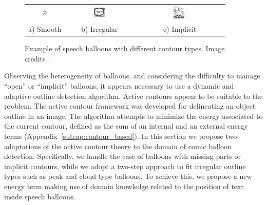 	\begin{figure}[!ht]%
	\begin{center}
	  \begin{tabular}{ccc}
	  \includegraphics[trim= 0px 2px 0mm 0mm, clip, width=0.13\textwidth]{round_balloon.png}&
	  \includegraphics[trim= 0mm 0mm 0mm 0mm, clip, width=0.17\textwidth]{peaked_balloon.png}&
	  \includegraphics[trim= 15px 7mm 5px 0mm, clip, width=0.145\textwidth]{open_balloon.png} \\ 
	  \footnotesize a) Smooth	& \footnotesize b) Irregular & \footnotesize c) Implicit
	  \end{tabular}
	\caption[Speech balloon contour types]{Example of speech balloons with different contour types. Image credits~\cite{Bubble09}.}
	\label{fig:se:balloon_examples}
	\end{center}
	\end{figure}	

Observing the heterogeneity of balloons, and considering the difficulty to manage ``open'' or ``implicit'' balloons, it appears necessary to use a dynamic and adaptive outline detection algorithm.
Active contours appear to be suitable to the problem.
The active contour framework was developed for delineating an object outline in an image.
The algorithm attempts to minimize the energy associated to the current contour, defined as the sum of an internal and an external energy terms (Appendix~\ref{sub:ap:contour_based}). 
In this section we propose two adaptations of the active contour theory to the domain of comic balloon detection.
Specifically, we handle the case of balloons with missing parts or implicit contours, while we adopt a two-step approach to fit irregular outline types such as peak and cloud type balloons. 
To achieve this, we propose a new energy term making use of domain knowledge related to the position of text inside speech balloons.


